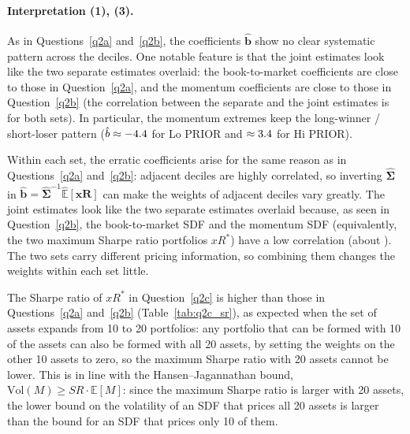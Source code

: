 \documentclass[11pt]{article}
\begin{document}
\paragraph{Interpretation (1), (3).}
As in Questions~\ref{q2a} and~\ref{q2b}, the coefficients $\hat{\mathbf{b}}$ show no clear systematic pattern
across the deciles. One notable feature is that the joint estimates look like the two separate estimates
overlaid: the book-to-market coefficients are close to those in Question~\ref{q2a}, and the momentum
coefficients are close to those in Question~\ref{q2b} (the correlation between the separate and the joint
estimates is \QtwocCorrBM{} for both sets). In particular, the momentum extremes keep the long-winner /
short-loser pattern ($\hat{b} \approx -4.4$ for Lo PRIOR and $\approx 3.4$ for Hi PRIOR).

Within each set, the erratic coefficients arise for the same reason as in Questions~\ref{q2a}
and~\ref{q2b}: adjacent deciles are highly correlated, so inverting $\hat{\bm{\Sigma}}$ in
$\hat{\mathbf{b}} = \hat{\bm{\Sigma}}^{-1}\widehat{\mathbb{E}}[\mathbf{xR}]$ can make the weights of adjacent
deciles vary greatly. The joint estimates look like the two separate estimates overlaid because, as seen in
Question~\ref{q2b}, the book-to-market SDF and the momentum SDF (equivalently, the two maximum Sharpe ratio
portfolios $xR^*$) have a low correlation (about \QtwobCorr). The two sets carry different pricing
information, so combining them changes the weights within each set little.

The Sharpe ratio of $xR^*$ in Question~\ref{q2c} is higher than those in Questions~\ref{q2a} and~\ref{q2b}
(Table~\ref{tab:q2c_sr}), as expected when the set of assets expands from 10 to 20 portfolios: any portfolio
that can be formed with 10 of the assets can also be formed with all 20 assets, by setting the weights on the
other 10 assets to zero, so the maximum Sharpe ratio with 20 assets cannot be lower. This is in line with the
Hansen--Jagannathan bound, $\mathrm{Vol}(M) \geq SR \cdot \mathbb{E}[M]$: since the maximum Sharpe ratio is
larger with 20 assets, the lower bound on the volatility of an SDF that prices all 20 assets is larger than
the bound for an SDF that prices only 10 of them.
\end{document}
